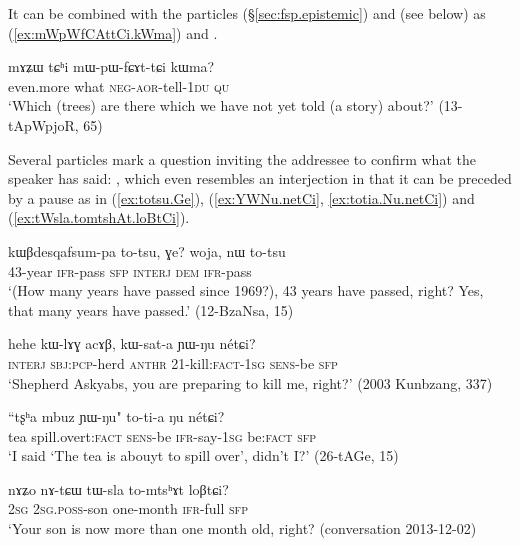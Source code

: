 It can be combined with the particles   (§\ref{sec:fsp.epistemic})  and  (see below) as  (\ref{ex:mWpWfCAttCi.kWma}) and .

\begin{exe}
\ex \label{ex:mWpWfCAttCi.kWma}
\gll  mɤʑɯ tɕʰi mɯ-pɯ-fɕɤt-tɕi kɯma? \\
 even.more what \textsc{neg}-\textsc{aor}-tell-\textsc{1du} \textsc{qu} \\
 \glt `Which (trees) are there which we have not yet told (a story) about?' (13-tApWpjoR, 65)
\end{exe} 

Several particles mark a question inviting the addressee to confirm what the speaker has said: , which even resembles an interjection in that it can be preceded by a pause as in (\ref{ex:totsu.Ge}),  (\ref{ex:YWNu.netCi}, \ref{ex:totia.Nu.netCi}) and  (\ref{ex:tWsla.tomtshAt.loBtCi}).

\begin{exe}
\ex \label{ex:totsu.Ge}
\gll kɯβdesqafsum-pa to-tsu, ɣe? woja, nɯ to-tsu \\
 43-year \textsc{ifr}-pass \textsc{sfp} \textsc{interj} \textsc{dem} \textsc{ifr}-pass \\
\glt `(How many years have passed since 1969?), 43 years have passed, right? Yes, that many years have passed.' (12-BzaNsa, 15)
\end{exe}

\begin{exe}
\ex \label{ex:YWNu.netCi}
\gll hehe kɯ-lɤɣ acɤβ, kɯ-sat-a ɲɯ-ŋu nétɕi? \\
\textsc{interj} \textsc{sbj}:\textsc{pcp}-herd  \textsc{anthr} 2\fl{}1-kill:\textsc{fact}-\textsc{1sg} \textsc{sens}-be \textsc{sfp} \\
\glt `Shepherd Askyabs, you are preparing to kill me, right?' (2003 Kunbzang, 337)
\end{exe}

\begin{exe}
\ex \label{ex:totia.Nu.netCi}
\gll  ``tʂʰa mbuz ɲɯ-ŋu" to-ti-a ŋu nétɕi? \\
tea spill.overt:\textsc{fact} \textsc{sens}-be \textsc{ifr}-say-\textsc{1sg} be:\textsc{fact} \textsc{sfp} \\
\glt `I said `The tea is abouyt to spill over', didn't I?' (26-tAGe, 15)
 \end{exe}
 
 \begin{exe}
\ex \label{ex:tWsla.tomtshAt.loBtCi}
\gll  nɤʑo nɤ-tɕɯ tɯ-sla to-mtsʰɤt loβtɕi? \\
\textsc{2sg} \textsc{2sg}.\textsc{poss}-son one-month \textsc{ifr}-full \textsc{sfp} \\
\glt `Your son is now more than one month old, right? (conversation 2013-12-02)
  \end{exe}
 
